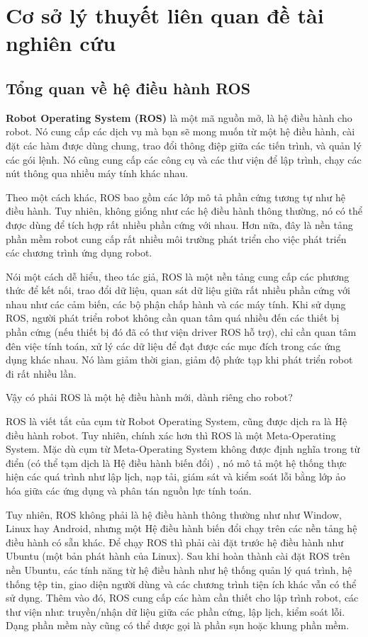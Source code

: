 \chapter{Cơ sở lý thuyết liên quan đề tài nghiên cứu}

\section{Tổng quan về hệ điều hành ROS}
\textbf{Robot Operating System (ROS)} là một mã nguồn mở, là hệ điều hành cho robot. Nó cung cấp các dịch vụ mà bạn sẽ mong muốn từ một hệ điều hành, cài đặt các hàm được dùng chung, trao đổi thông điệp giữa các tiến trình, và quản lý các gói lệnh. Nó cũng cung cấp các công cụ và các thư viện để lập trình, chạy các nút thông qua nhiều máy tính khác nhau. 

Theo một cách khác, ROS bao gồm các lớp mô tả phần cứng tương tự như hệ điều hành. Tuy nhiên, không giống như các hệ điều hành thông thường, nó có thể được dùng để tích hợp rất nhiều phần cứng với nhau. Hơn nữa, đây là nền tảng phần mềm robot cung cấp rất nhiều môi trường phát triển cho việc phát triển các chương trình ứng dụng robot.

Nói một cách dễ hiểu, theo tác giả, ROS là một nền tảng cung cấp các phương thức để kết nối, trao đổi dữ liệu, quan sát dữ liệu giữa rất nhiều phần cứng với nhau như các cảm biến, các bộ phận chấp hành và các máy tính. Khi sử dụng ROS, người phát triển robot không cần quan tâm quá nhiều đến các thiết bị phần cứng (nếu thiết bị đó đã có thư viện driver ROS hỗ trợ), chỉ cần quan tâm đên việc tính toán, xử lý các dữ liệu để đạt được các mục đích trong các ứng dụng khác nhau. Nó làm giảm thời gian, giảm độ phức tạp khi phát triển robot đi rất nhiều lần. 

Vậy có phải ROS là một hệ điều hành mới, dành riêng cho robot?

ROS là viết tắt của cụm từ Robot Operating System, cũng được dịch ra là Hệ điều hành robot. Tuy nhiên, chính xác hơn thì ROS là một Meta-Operating System. Mặc dù cụm từ Meta-Operating System không được định nghĩa trong từ điển (có thể tạm dịch là Hệ điều hành biến đổi) , nó mô tả một hệ thống thực hiện các quá trình như lập lịch, nạp tải, giám sát và kiểm soát lỗi bằng lớp ảo hóa giữa các ứng dụng và phân tán nguồn lực tính toán.

Tuy nhiên, ROS không phải là hệ điều hành thông thường như như Window, Linux hay Android, nhưng một Hệ điều hành biến đổi chạy trên các nền tảng hệ điều hành có sẵn khác. Để chạy ROS thì phải cài đặt trước hệ điều hành như Ubuntu (một bản phát hành của Linux). Sau khi hoàn thành cài đặt ROS trên nền Ubuntu,  các tính năng từ hệ điều hành như hệ thống quản lý quá trình, hệ thống tệp tin, giao diện người dùng và các chương trình tiện ích khác vẫn có thể sử dụng. Thêm vào đó, ROS cung cấp các hàm cần thiết cho lập trình robot, các thư viện như: truyền/nhận dữ liệu giữa các phần cứng, lập lịch, kiểm soát lỗi. Dạng phần mềm này cũng có thể dược gọi là phần sụn hoặc khung phần mềm.

